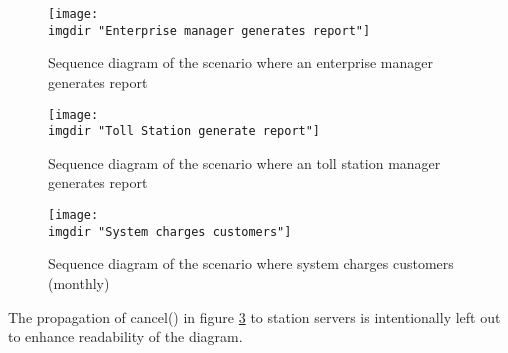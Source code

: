 \begin{figure}
  \texttt{[image: \\imgdir "Enterprise manager generates report"]}
  \caption{Sequence diagram of the scenario where an enterprise manager generates report}
  \label{fig:seq_diag:enterprise_manager_generate_report}
\end{figure}

\begin{figure}
  \texttt{[image: \\imgdir "Toll Station generate report"]}
  \caption{Sequence diagram of the scenario where an toll station manager generates report}
  \label{fig:seq_diag:enterprise_manager_generate_report}
\end{figure}

\begin{figure}
  \texttt{[image: \\imgdir "System charges customers"]}
  \caption{Sequence diagram of the scenario where system charges customers (monthly)}
  \label{fig:seq_diag:system_charges_customers}
\end{figure}
The propagation of cancel() in figure \ref{fig:seq_diag:system_charges_customers} to station servers is intentionally left out to enhance readability of the diagram.